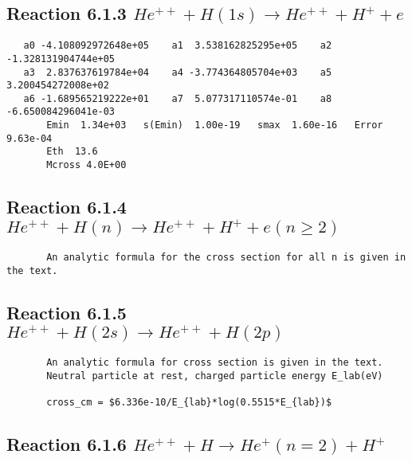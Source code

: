 \documentclass[12pt,dvipdfmx]{article}
\begin{document}
\newpage
\subsection{
Reaction 6.1.3 $   He^{++} + H(1s) \rightarrow He^{++} + H^+ + e$}


\begin{small}\begin{verbatim}
   a0 -4.108092972648e+05    a1  3.538162825295e+05    a2 -1.328131904744e+05
   a3  2.837637619784e+04    a4 -3.774364805704e+03    a5  3.200454272008e+02
   a6 -1.689565219222e+01    a7  5.077317110574e-01    a8 -6.650084296041e-03
       Emin  1.34e+03   s(Emin)  1.00e-19   smax  1.60e-16   Error 9.63e-04
       Eth  13.6
       Mcross 4.0E+00
\end{verbatim}\end{small}

\newpage
\subsection{
Reaction 6.1.4 $   He^{++} + H(n) \rightarrow  He^{++} + H^+ + e   (n \geq 2)$}

\begin{small}\begin{verbatim}
       An analytic formula for the cross section for all n is given in the text.
\end{verbatim}\end{small}

\newpage
\subsection{
Reaction 6.1.5 $   He^{++} + H(2s) \rightarrow  He^{++} + H(2p)   $}

\begin{small}\begin{verbatim}
       An analytic formula for cross section is given in the text.
       Neutral particle at rest, charged particle energy E_lab(eV)

       cross_cm = $6.336e-10/E_{lab}*log(0.5515*E_{lab})$
\end{verbatim}\end{small}

\newpage
\subsection{
Reaction 6.1.6 $   He^{++} + H \rightarrow He^+(n=2) + H^+$}
\end{document}
